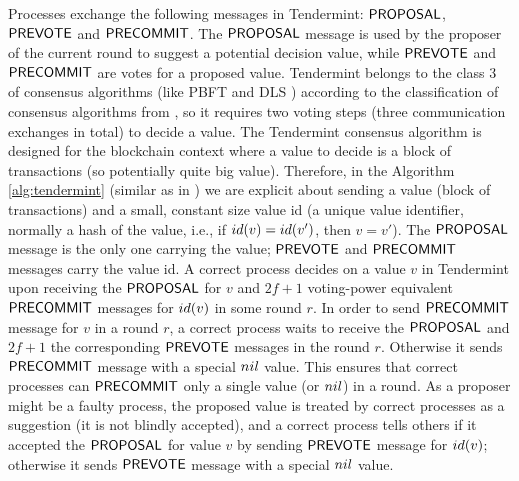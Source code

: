 Processes exchange the following messages in Tendermint: $\mathsf{PROPOSAL}$, $\mathsf{PREVOTE}$ and $\mathsf{PRECOMMIT}$. The 
$\mathsf{PROPOSAL}$ message is used by the proposer of the current round to suggest a potential decision value, while 
$\mathsf{PREVOTE}$ and $\mathsf{PRECOMMIT}$ are votes for a proposed value. Tendermint belongs to the class 3 of consensus algorithms (like PBFT \cite{CL02:tcs} and DLS \cite{DLS88:jacm}) according to the classification of consensus algorithms from \cite{RMS10:dsn}, so it requires two voting steps (three communication exchanges in total) to decide a value. The Tendermint consensus algorithm is designed for the blockchain context where a value to decide is a block of transactions (so potentially quite big value). Therefore, in the Algorithm \ref{alg:tendermint} (similar as in \cite{CL02:tcs}) we are explicit about sending a value (block of transactions) and a small, constant size value id (a unique value identifier, normally a hash of the value, i.e., if $id(v) = id(v')$, then $v=v'$). The $\mathsf{PROPOSAL}$ message is the only one carrying the value; $\mathsf{PREVOTE}$ and $\mathsf{PRECOMMIT}$ messages carry the value id. 
A correct process decides on a value $v$ in Tendermint upon receiving the $\mathsf{PROPOSAL}$ for $v$ and $2f+1$ voting-power equivalent $\mathsf{PRECOMMIT}$ messages for $id(v)$ in some round $r$. In order to send $\mathsf{PRECOMMIT}$ message for $v$ in a round $r$, a correct process waits to receive the $\mathsf{PROPOSAL}$ and $2f+1$ the corresponding $\mathsf{PREVOTE}$ messages in the round $r$. Otherwise it sends $\mathsf{PRECOMMIT}$ message with a special $nil$ value.  This ensures that correct processes can $\mathsf{PRECOMMIT}$ only a single value (or $nil$) in a round. 
As a proposer might be a faulty process, the proposed value is treated by correct processes as a suggestion (it is not blindly accepted), and a correct process tells others if it accepted the $\mathsf{PROPOSAL}$ for value $v$ by sending $\mathsf{PREVOTE}$ message for $id(v)$; otherwise it sends $\mathsf{PREVOTE}$ message with a special $nil$ value. 

